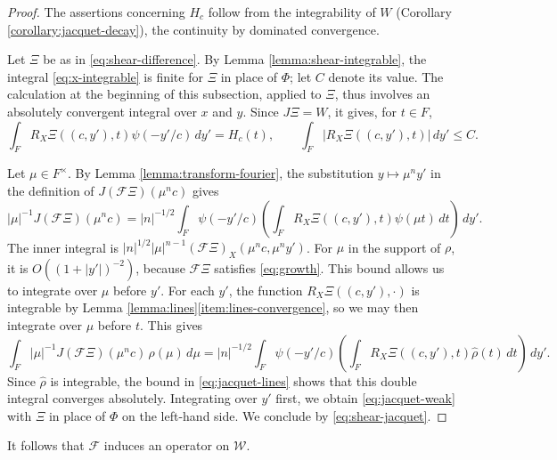 \documentclass[reqno]{amsart}
\theoremstyle{plain}
\theoremstyle{definition}
\theoremstyle{itplain}
\numberwithin{equation}{section}
\numberwithin{theorem}{section}
\begin{document}
\begin{proof}
  The assertions concerning $H_c$ follow from the integrability of $W$ (Corollary \ref{corollary:jacquet-decay}), the continuity by dominated convergence.

  Let $\Xi$ be as in \eqref{eq:shear-difference}.  By Lemma \ref{lemma:shear-integrable}, the integral \eqref{eq:x-integrable} is finite for $\Xi$ in place of $\Phi$; let $C$ denote its value.  The calculation at the beginning of this subsection, applied to $\Xi$, thus involves an absolutely convergent integral over $x$ and $y$.  Since $J \Xi = W$, it gives, for $t \in F$,
  \begin{equation}\label{eq:jacquet-lines}
    \int_F R_X \Xi((c, y'), t) \psi(- y' / c) \, d y' = H_c(t),
    \qquad
    \int_F \lvert R_X \Xi((c, y'), t) \rvert \, d y' \leq C.
  \end{equation}

  Let $\mu \in F^\times$.  By Lemma \ref{lemma:transform-fourier}, the substitution $y \mapsto \mu^n y'$ in the definition of $J(\mathcal{F} \Xi)(\mu^n c)$ gives
  \begin{equation*}
    \lvert \mu \rvert^{-1} J(\mathcal{F} \Xi)(\mu^n c)
    = \lvert n \rvert^{-1/2} \int_F \psi(- y' / c) \left( \int_F R_X \Xi((c, y'), t) \psi(\mu t) \, d t \right) \, d y'.
  \end{equation*}
  The inner integral is $\lvert n \rvert^{1/2} \lvert \mu \rvert^{n-1} (\mathcal{F} \Xi)_X(\mu^n c, \mu^n y')$.  For $\mu$ in the support of $\rho$, it is $O((1 + \lvert y' \rvert)^{-2})$, because $\mathcal{F} \Xi$ satisfies \eqref{eq:growth}.  This bound allows us to integrate over $\mu$ before $y'$.  For each $y'$, the function $R_X \Xi((c, y'), \cdot)$ is integrable by Lemma \ref{lemma:lines}\eqref{item:lines-convergence}, so we may then integrate over $\mu$ before $t$.  This gives
  \begin{equation*}
    \int_{F} \lvert \mu \rvert^{-1} J(\mathcal{F} \Xi)(\mu^n c) \, \rho(\mu) \, d \mu
    = \lvert n \rvert^{-1/2} \int_F \psi(- y' / c) \left( \int_F R_X \Xi((c, y'), t) \hat{\rho}(t) \, d t \right) \, d y'.
  \end{equation*}
  Since $\hat{\rho}$ is integrable, the bound in \eqref{eq:jacquet-lines} shows that this double integral converges absolutely.  Integrating over $y'$ first, we obtain \eqref{eq:jacquet-weak} with $\Xi$ in place of $\Phi$ on the left-hand side.  We conclude by \eqref{eq:shear-jacquet}.
\end{proof}

It follows that $\mathcal{F}$ induces an operator on $\mathcal{W}$.
\end{document}
